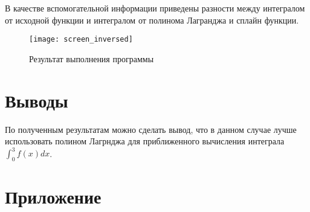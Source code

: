 В качестве вспомогательной информации приведены разности между интегралом от исходной функции и интегралом от полинома Лагранджа и сплайн функции.

\begin{figure}[H]
\begin{center}
	\texttt{[image: screen\_inversed]}
	\caption{Результат выполнения программы}
	\label{fig:res}
\end{center}
\end{figure}

\section{Выводы}

По полученным результатам можно сделать вывод, что в данном случае лучше использовать полином Лагрнджа для приближенного вычисления интеграла $\int_0^3 f(x)dx$.

\newpage

\section*{Приложение}


\parindent=1cm


